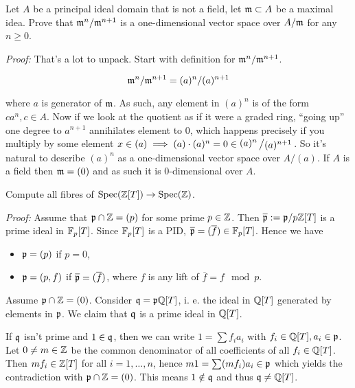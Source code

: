 \begin{exercise}
    Let $A$ be a principal ideal domain that is not a field, let $\mathfrak{m} \subset A$ be a maximal idea. Prove that $\mathfrak{m}^n / \mathfrak{m}^{n+1}$ is a one-dimensional vector space over $A/\mathfrak{m}$ for any $n\geq 0$.
\end{exercise}
\textit{Proof:} That's a lot to unpack. Start with definition for $\mathfrak{m}^n / \mathfrak{m}^{n+1}$.

$$\mathfrak{m}^n / \mathfrak{m}^{n+1}= (a)^n / (a)^{n+1}$$

where $a$ is generator of $\mathfrak{m}$. As such, any element in $(a)^n$ is of the form $ca^n, c \in A$. Now if we look at the quotient as if it were a graded ring, \enquote{going up} one degree to $a^{n+1}$ annihilates element to $0$, which happens precisely if you multiply by some element $x\in (a) \implies (a)\cdot (a)^n = 0 \in \bigslant{(a)^n}{(a)^{n+1}}$. So it's natural to describe $(a)^n$ as a one-dimensional vector space over $A/(a)$.
If $A$ is a field then $\mathfrak{m}=(0)$ and as such it is $0$-dimensional over $A$.

\begin{exercise}
    Compute all fibres of $\operatorname{Spec} (\mathbb{Z}[T]) \rightarrow \operatorname{Spec}(\mathbb{Z})$.
\end{exercise}

\textit{Proof:} Assume that $\mathfrak{p}\cap \mathbb{Z} = (p)$ for some prime $p\in \mathbb{Z}$. Then $\overline{\mathfrak{p}}:= \mathfrak{p} / p\mathbb{Z}[T]$ is a prime ideal in $\mathbb{F}_p[T]$. Since $\mathbb{F}_p[T]$ is a PID, $\overline{\mathfrak{p}}=(\overline{f})\in \mathbb{F}_p[T]$. Hence we have
\begin{itemize}
    \item $\mathfrak{p} = (p)$ if $p=0$,
    \item $\mathfrak{p} = (p,f)$ if $\overline{\mathfrak{p}}=(\overline{f})$, where $f$ is any lift of $\overline{f}= f \mod p$. 
\end{itemize}

Assume $\mathfrak{p} \cap \mathbb{Z} = (0)$.  Consider $\mathfrak{q}=\mathfrak{p} \mathbb{Q}[T]$, i. e. the ideal in $\mathbb{Q}[T]$ generated by elements in $\mathfrak{p}$. We claim that $\mathfrak{q}$ is a prime ideal in $\mathbb{Q}[T]$. 

If $\mathfrak{q}$ isn't prime and $1\in\mathfrak{q}$,  then we can write $1=\sum f_i a_i$ with $f_i\in \mathbb{Q}[T], a_i\in\mathfrak{p}$. Let $0\neq m \in \mathbb{Z}$ be the common denominator of all coefficients of all $f_i\in \mathbb{Q}[T]$. Then $mf_i\in \mathbb{Z}[T]$ for all $i=1,\ldots,n$, hence $m1=\sum (mf_i)a_i\in\mathfrak{p}$ which yields the contradiction with $\mathfrak{p} \cap \mathbb{Z} = (0)$. This means $1\notin \mathfrak{q}$ and thus $\mathfrak{q} \neq \mathbb{Q}[T]$.

